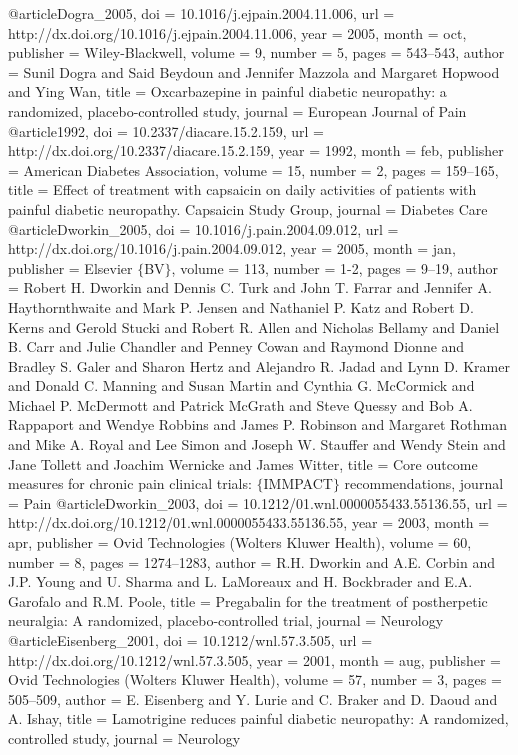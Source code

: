 @article{Dogra_2005,
	doi = {10.1016/j.ejpain.2004.11.006},
	url = {http://dx.doi.org/10.1016/j.ejpain.2004.11.006},
	year = 2005,
	month = {oct},
	publisher = {Wiley-Blackwell},
	volume = {9},
	number = {5},
	pages = {543--543},
	author = {Sunil Dogra and Said Beydoun and Jennifer Mazzola and Margaret Hopwood and Ying Wan},
	title = {Oxcarbazepine in painful diabetic neuropathy: a randomized, placebo-controlled study},
	journal = {European Journal of Pain}
}
@article{1992,
	doi = {10.2337/diacare.15.2.159},
	url = {http://dx.doi.org/10.2337/diacare.15.2.159},
	year = 1992,
	month = {feb},
	publisher = {American Diabetes Association},
	volume = {15},
	number = {2},
	pages = {159--165},
	title = {Effect of treatment with capsaicin on daily activities of patients with painful diabetic neuropathy. Capsaicin Study Group},
	journal = {Diabetes Care}
}
@article{Dworkin_2005,
	doi = {10.1016/j.pain.2004.09.012},
	url = {http://dx.doi.org/10.1016/j.pain.2004.09.012},
	year = 2005,
	month = {jan},
	publisher = {Elsevier $\lbrace$BV$\rbrace$},
	volume = {113},
	number = {1-2},
	pages = {9--19},
	author = {Robert H. Dworkin and Dennis C. Turk and John T. Farrar and Jennifer A. Haythornthwaite and Mark P. Jensen and Nathaniel P. Katz and Robert D. Kerns and Gerold Stucki and Robert R. Allen and Nicholas Bellamy and Daniel B. Carr and Julie Chandler and Penney Cowan and Raymond Dionne and Bradley S. Galer and Sharon Hertz and Alejandro R. Jadad and Lynn D. Kramer and Donald C. Manning and Susan Martin and Cynthia G. McCormick and Michael P. McDermott and Patrick McGrath and Steve Quessy and Bob A. Rappaport and Wendye Robbins and James P. Robinson and Margaret Rothman and Mike A. Royal and Lee Simon and Joseph W. Stauffer and Wendy Stein and Jane Tollett and Joachim Wernicke and James Witter},
	title = {Core outcome measures for chronic pain clinical trials: $\lbrace$IMMPACT$\rbrace$ recommendations},
	journal = {Pain}
}
@article{Dworkin_2003,
	doi = {10.1212/01.wnl.0000055433.55136.55},
	url = {http://dx.doi.org/10.1212/01.wnl.0000055433.55136.55},
	year = 2003,
	month = {apr},
	publisher = {Ovid Technologies (Wolters Kluwer Health)},
	volume = {60},
	number = {8},
	pages = {1274--1283},
	author = {R.H. Dworkin and A.E. Corbin and J.P. Young and U. Sharma and L. LaMoreaux and H. Bockbrader and E.A. Garofalo and R.M. Poole},
	title = {Pregabalin for the treatment of postherpetic neuralgia: A randomized, placebo-controlled trial},
	journal = {Neurology}
}
@article{Eisenberg_2001,
	doi = {10.1212/wnl.57.3.505},
	url = {http://dx.doi.org/10.1212/wnl.57.3.505},
	year = 2001,
	month = {aug},
	publisher = {Ovid Technologies (Wolters Kluwer Health)},
	volume = {57},
	number = {3},
	pages = {505--509},
	author = {E. Eisenberg and Y. Lurie and C. Braker and D. Daoud and A. Ishay},
	title = {Lamotrigine reduces painful diabetic neuropathy: A randomized, controlled study},
	journal = {Neurology}
}

